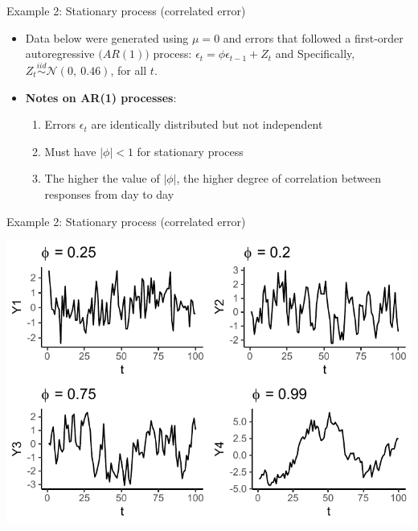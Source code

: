 \documentclass[
  9pt,
  ignorenonframetext,
]{beamer}
\providecommand{\tightlist}{%
  \setlength{\itemsep}{0pt}\setlength{\parskip}{0pt}}
\begin{document}
\begin{frame}{}
\protect\hypertarget{section}{}
\begin{block}{Example 2: Stationary process (correlated error)}
\protect\hypertarget{example-2-stationary-process-correlated-error}{}
\begin{itemize}
\item
  Data below were generated using \(\mu=0\) and errors that followed a
  first-order autoregressive \(\big(AR(1)\big)\) process:
  \(\epsilon_t = \phi\epsilon_{t-1} + Z_t\) and Specifically,
  \(Z_t \stackrel {iid} \sim \mathcal {N} (0,\ 0.46)\), for all \(t\).
\item
  \textbf{Notes on AR(1) processes}:

  \begin{enumerate}
  \tightlist
  \item
    Errors \(\epsilon_t\) are identically distributed but not
    independent
  \item
    Must have \(|\phi| < 1\) for stationary process
  \item
    The higher the value of \(|\phi|\), the higher degree of correlation
    between responses from day to day
  \end{enumerate}
\end{itemize}
\end{block}
\end{frame}

\begin{frame}{}
\protect\hypertarget{section-1}{}
\begin{block}{Example 2: Stationary process (correlated error)}
\protect\hypertarget{example-2-stationary-process-correlated-error-1}{}
\tiny

\begin{center}\includegraphics[width=0.9\linewidth]{figs_L1/AR1-1} \end{center}

\tiny
\end{block}
\end{frame}
\end{document}
